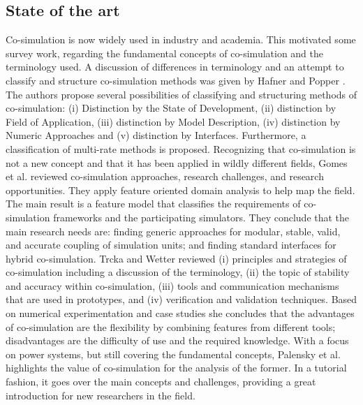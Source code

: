 \subsection{State of the art}
\label{Sota}
Co-simulation is now widely used in industry and academia.
This motivated some survey work, regarding the fundamental concepts of co-simulation and the terminology used.
A discussion of differences in terminology and an attempt to classify and structure co-simulation methods was given by Hafner and Popper \cite{Hafner2017}.
The authors propose several possibilities of classifying and structuring methods of co-simulation: (i) Distinction by the State of Development, (ii) distinction by Field of Application, (iii) distinction by Model Description, (iv) distinction by Numeric Approaches and (v) distinction by Interfaces. 
Furthermore, a classification of multi-rate methods is proposed. 
Recognizing that co-simulation is not a new concept and that it has been applied in wildly different fields, Gomes et al. \cite{Gomes2018} reviewed co-simulation approaches, research challenges, and research opportunities. 
They apply feature oriented domain analysis \cite{Kang1990} to help map the field. 
The main result is a feature model that classifies the requirements of co-simulation frameworks and the participating simulators. 
They conclude that the main research needs are: finding generic approaches for modular, stable, valid, and accurate coupling of simulation units; and finding standard interfaces for hybrid co-simulation. 
Trcka and Wetter \cite{Trcka2007} reviewed (i) principles and strategies of co-simulation including a discussion of the terminology, (ii) the topic of stability and accuracy within co-simulation, (iii) tools and communication mechanisms that are used in prototypes, and (iv) verification and validation techniques. 
Based on numerical experimentation and case studies she concludes that the advantages  of co-simulation are the flexibility by combining features from different tools; disadvantages are the difficulty of use and the required knowledge.
With a focus on power systems, but still covering the fundamental concepts, Palensky et al. \cite{Palensky2017} highlights the value of co-simulation for the analysis of the former. 
In a tutorial fashion, it goes over the main concepts and challenges, providing a great introduction for new researchers in the field.

